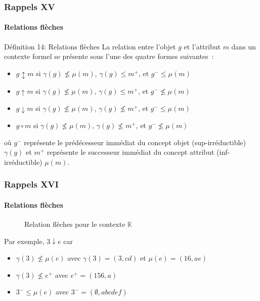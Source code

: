 \documentclass[french]{beamer}
\def\KK{\mathbb{K}}
\begin{document}
\begin{frame}
\frametitle{Rappels XV}
\framesubtitle{Relations flèches}
\begin{block}{Définition 14: Relations flèches}
La relation entre l'objet $g$ et l'attribut $m$ dans un contexte formel se présente sous l'une des quatre formes suivantes~:
\begin{itemize}
\item $g \updownarrow m$ si $\gamma(g) \not\leq \mu(m)$, $\gamma(g) \leq m^+$, et $g^- \leq \mu(m)$
\item $g \uparrow m$ si $\gamma(g) \not\leq \mu(m)$, $\gamma(g) \leq m^+$, et $g^- \not\leq \mu(m)$
\item $g \downarrow m$ si $\gamma(g) \not\leq \mu(m)$, $\gamma(g) \not\leq m^+$, et $g^- \leq \mu(m)$
\item $g \circ m$ si $\gamma(g) \not\leq \mu(m)$, $\gamma(g) \not\leq m^+$, et $g^- \not\leq \mu(m)$
\end{itemize}
où $g^-$ représente le prédécesseur immédiat du concept objet (sup-irréductible) $\gamma(g)$ 
et $m^+$ représente le successeur immédiat du concept attribut (inf-irréductible) $ \mu(m)$.
\end{block}
\end{frame}

\begin{frame}
\frametitle{Rappels XVI}
\framesubtitle{Relations flèches}
\begin{figure}[h]
\label{cap:fig:arrow}
\begin{center}
\begin{cxt}%
\cxtName{}%
%
%
%
%
%
%
\end{cxt}
\end{center}
\caption{Relation flèches pour le contexte $\KK$}
\end{figure}
Par exemple, $3 \downarrow e$ car 
\begin{itemize}
\item $\gamma(3) \not\leq \mu(e)$ avec $\gamma(3)= (3, cd)$ et $\mu(e)=(16, ae)$
\item $\gamma(3) \not\leq e^+$ avec $e^+ = (156,a)$
\item $3^- \leq \mu(e)$ avec $3^-=(\emptyset, abcdef)$
\end{itemize}
\end{frame}
\end{document}
